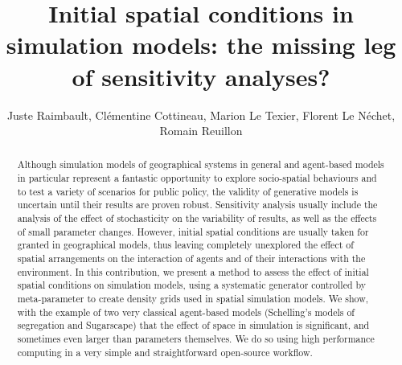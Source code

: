 \documentclass[Afour,sageh,times]{sagej}
\begin{document}




\title{Initial spatial conditions in simulation models: the missing leg of sensitivity analyses?}

\author{Juste Raimbault, 
Cl{\' e}mentine Cottineau,
Marion Le Texier, 
Florent Le N{\' e}chet, 
Romain Reuillon
}







\begin{abstract}
Although simulation models of geographical systems in general and agent-based models in particular represent a fantastic opportunity to explore socio-spatial behaviours and to test a variety of scenarios for public policy, the validity of generative models is uncertain until their results are proven robust. Sensitivity analysis usually include the analysis of the effect of stochasticity on the variability of results, as well as the effects of small parameter changes. However, initial spatial conditions are usually taken for granted in geographical models, thus leaving completely unexplored the effect of spatial arrangements on the interaction of agents and of their interactions with the environment. In this contribution, we present a method to assess the effect of initial spatial conditions on simulation models, using a systematic generator controlled by meta-parameter to create density grids used in spatial simulation models. We show, with the example of two very classical agent-based models (Schelling's models of segregation and Sugarscape) that the effect of space in simulation is significant, and sometimes even larger than parameters themselves. We do so using high performance computing in a very simple and straightforward open-source workflow.
\end{abstract}
\end{document}
